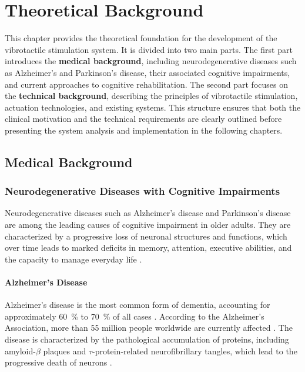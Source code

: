 \chapter[Theoretical Background]{Theoretical Background}\label{kap:Kapitel2}
This chapter provides the theoretical foundation for the development of the vibrotactile stimulation system.
It is divided into two main parts. The first part introduces the \textbf{medical background}, including neurodegenerative diseases such as Alzheimer’s and Parkinson’s disease, their associated cognitive impairments, and current approaches to cognitive rehabilitation.
The second part focuses on the \textbf{technical background}, describing the principles of vibrotactile stimulation, actuation technologies, and existing systems.
This structure ensures that both the clinical motivation and the technical requirements are clearly outlined before presenting the system analysis and implementation in the following chapters.

\section{Medical Background}

\subsection{Neurodegenerative Diseases with Cognitive Impairments}
Neurodegenerative diseases such as Alzheimer’s disease and Parkinson’s disease are among the leading causes of cognitive impairment in older adults. They are characterized by a progressive loss of neuronal structures and functions, which over time leads to marked deficits in memory, attention, executive abilities, and the capacity to manage everyday life \cite{Harvey.2019}.

\subsubsection{Alzheimer's Disease}
Alzheimer’s disease is the most common form of dementia, accounting for approximately \SI{60}{\%} to \SI{70}{\%} of all cases \cite{WorldHealthOrganization.2021}. According to the Alzheimer’s Association, more than 55 million people worldwide are currently affected \cite{Association.2025}. The disease is characterized by the pathological accumulation of proteins, including amyloid-$\beta$ plaques and $\tau$-protein-related neurofibrillary tangles, which lead to the progressive death of neurons \cite{Dubois.2016}.

